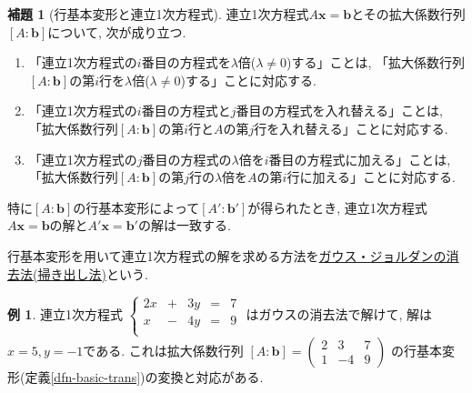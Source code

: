 \documentclass[dvipdfmx,a4paper,11pt]{article} %
\theoremstyle{definition}
\newtheorem{lem}[thm]{補題}
\newtheorem{exa}[thm]{例}
\begin{document}
    \begin{lem}[{\cite[定義 2.4.3, 補題 2.4.4]{O}行基本変形と連立1次方程式}]
    \label{lem-gyokihon-renritsu}
連立1次方程式$A\bm{x}=\bm{b}$とその拡大係数行列$[A:\bm{b}]$について, 次が成り立つ.
 \begin{enumerate}
   \setlength{\parskip}{0cm} 
  \setlength{\itemsep}{0cm}
   \item 「連立1次方程式の$i$番目の方程式を$\lambda$倍($\lambda\neq 0$)する」ことは, 「拡大係数行列$[A:\bm{b}]$の第$i$行を$\lambda$倍($\lambda\neq 0$)する」ことに対応する. 
 \item 「連立1次方程式の$i$番目の方程式と$j$番目の方程式を入れ替える」ことは, 「拡大係数行列$[A:\bm{b}]$の第$i$行と$A$の第$j$行を入れ替える」ことに対応する. 
 \item 「連立1次方程式の$j$番目の方程式の$\lambda$倍を$i$番目の方程式に加える」ことは, 「拡大係数行列$[A:\bm{b}]$の第$j$行の$\lambda$倍を$A$の第$i$行に加える」ことに対応する. 
 \end{enumerate}
 
 特に$[A: \bm{b}]$の行基本変形によって$[A' : \bm{b}']$が得られたとき, 
 連立1次方程式$A\bm{x}=\bm{b}$の解と$A'\bm{x}=\bm{b}'$の解は一致する. 
  \end{lem}
  
行基本変形を用いて連立1次方程式の解を求める方法を\underline{ガウス・ジョルダンの消去法(掃き出し法)}という.

 \begin{exa}
 連立1次方程式
 $
 \left\{ 
\begin{matrix}
2x&+&3y& = &7 \\
x&-&4y& = &9 \\
\end{matrix}
\right.
 $
 はガウスの消去法で解けて, 解は$x = 5, y=-1$である. 
これは拡大係数行列
 $[A : \bm{b}] = 
  \begin{pmatrix}
 2 & 3  &7\\
 1 & -4 &9
 \end{pmatrix}
 $
の行基本変形(定義\ref{dfn-basic-trans})の変換と対応がある. 
 \end{exa}
\end{document}
